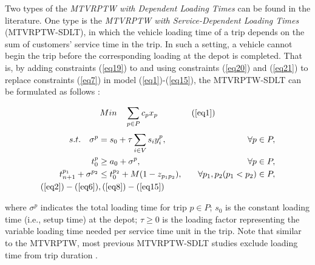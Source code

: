 Two types of the \textit{MTVRPTW with Dependent Loading Times} can be found in the literature.  One type is the \textit{MTVRPTW with Service-Dependent Loading Times} (MTVRPTW-SDLT), in which the vehicle loading time of a trip depends on the sum of customers' service time in the trip.  In such a setting, a vehicle cannot begin the trip before the corresponding loading at the depot is completed. That is, by adding constraints (\ref{eq19}) to and using constraints (\ref{eq20}) and (\ref{eq21}) to replace constraints (\ref{eq7}) in model (\ref{eq1})-(\ref{eq15}), the MTVRPTW-SDLT can be formulated as follows \citep{azi2010exact}:

\begin{spreadlines}{14pt} %
\allowdisplaybreaks
\begin{align} 
Min &\quad \sum_{p \in P} c_p x_p &\quad
\tag{\ref{eq1}}
\end{align}
\begin{align}
    s.t. \quad \sigma^p &= s_0 + \tau \sum_{i \in V} s_i y^p_i, & \quad \forall p \in P,
\label{eq19} \\
    t^p_0 &\geq a_0 + \sigma^p, & \quad \forall p \in P,
\label{eq20} \\
    t^{p_1}_{n + 1} + \sigma^{p_2} &\leq t^{p_2}_0 + M(1 - z_{{p_1}{p_2}}), & \quad \forall p_1, p_2 (p_1 < p_2) \in P,
\label{eq21} \\
(\ref{eq2})-(\ref{eq6})&, (\ref{eq8})-(\ref{eq15}) \nonumber
\end{align}
\end{spreadlines}

where $\sigma^p$ indicates the total loading time for trip $p \in P$; $s_0$ is the constant loading time (i.e., setup time) at the depot; $\tau \geq 0$ is the loading factor representing the variable loading time needed per service time unit in the trip.  Note that similar to the MTVRPTW, most previous MTVRPTW-SDLT studies exclude loading time from trip duration \citep[e.g.,][]{macedo2011solving, hernandez2014new}.
\newline



